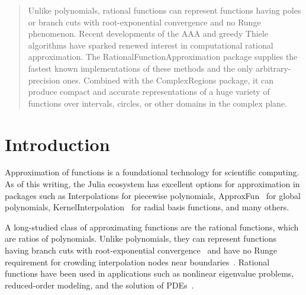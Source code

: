 \documentclass{juliacon}
\begin{document}


\maketitle

\begin{abstract}
Unlike polynomials, rational functions can represent functions having poles or branch cuts with root-exponential convergence and no Runge phenomenon. Recent developments of the AAA and greedy Thiele algorithms have sparked renewed interest in computational rational approximation. The \textsf{RationalFunctionApproximation} package supplies the fastest known implementations of these methods and the only arbitrary-precision ones. Combined with the \textsf{ComplexRegions} package, it can produce compact and accurate representations of a huge variety of functions over intervals, circles, or other domains in the complex plane.
\end{abstract}

\section{Introduction}

Approximation of functions is a foundational technology for scientific computing. As of this writing, the Julia ecosystem has excellent options for approximation in packages such as \textsf{Interpolations} \cite{kittisopikulInterpolationsjl2025} for piecewise polynomials, \textsf{ApproxFun}~\cite{olverPracticalFramework2014} for global polynomials, \textsf{KernelInterpolation}~\cite{lampertKernelInterpolationjlMultivariate2024} for radial basis functions, and many others.

A long-studied class of approximating functions are the rational functions, which are ratios of polynomials. Unlike polynomials, they can represent functions having branch cuts with root-exponential convergence~\cite{newmanRationalApproximation1964, herremansResolutionSingularities2023} and have no Runge requirement for crowding interpolation nodes near boundaries~\cite{platteImpossibilityFast2011}. Rational functions have been used in applications such as nonlinear eigenvalue problems, reduced-order modeling, and the solution of PDEs~\cite{antoulasInterpolatoryMethods2020,budisaRationalApproximation2022,gopalSolvingLaplace2019,hautSolvingBurgers2013,lietaertAutomaticRational2022,rodriguezPAAAAlgorithm2022,trefethenNumericalConformal2020}.
\end{document}
